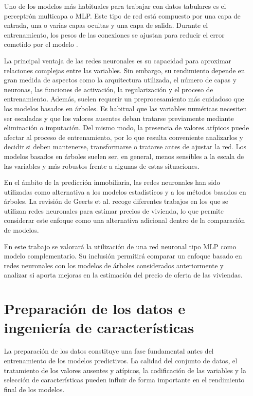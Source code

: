 \documentclass[IB]{TFUOC}%
\begin{document}
Uno de los modelos más habituales para trabajar con datos tabulares es el perceptrón multicapa o MLP. Este tipo de red está compuesto por una capa de entrada, una o varias capas ocultas y una capa de salida. Durante el entrenamiento, los pesos de las conexiones se ajustan para reducir el error cometido por el modelo \cite{goodfellow2016deep}.

La principal ventaja de las redes neuronales es su capacidad para aproximar relaciones complejas entre las variables. Sin embargo, su rendimiento depende en gran medida de aspectos como la arquitectura utilizada, el número de capas y neuronas, las funciones de activación, la regularización y el proceso de entrenamiento. Además, suelen requerir un preprocesamiento más cuidadoso que los modelos basados en árboles. Es habitual que las variables numéricas necesiten ser escaladas y que los valores ausentes deban tratarse previamente mediante eliminación o imputación. Del mismo modo, la presencia de valores atípicos puede afectar al proceso de entrenamiento, por lo que resulta conveniente analizarlos y decidir si deben mantenerse, transformarse o tratarse antes de ajustar la red. Los modelos basados en árboles suelen ser, en general, menos sensibles a la escala de las variables y más robustos frente a algunas de estas situaciones.

En el ámbito de la predicción inmobiliaria, las redes neuronales han sido utilizadas como alternativa a los modelos estadísticos y a los métodos basados en árboles. La revisión de Geerts et al. \cite{houseprice_survey2023} recoge diferentes trabajos en los que se utilizan redes neuronales para estimar precios de vivienda, lo que permite considerar este enfoque como una alternativa adicional dentro de la comparación de modelos.

En este trabajo se valorará la utilización de una red neuronal tipo MLP como modelo complementario. Su inclusión permitirá comparar un enfoque basado en redes neuronales con los modelos de árboles considerados anteriormente y analizar si aporta mejoras en la estimación del precio de oferta de las viviendas.

\section{Preparación de los datos e ingeniería de características}

La preparación de los datos constituye una fase fundamental antes del entrenamiento de los modelos predictivos. La calidad del conjunto de datos, el tratamiento de los valores ausentes y atípicos, la codificación de las variables y la selección de características pueden influir de forma importante en el rendimiento final de los modelos.
\end{document}
